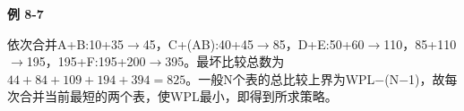 {\color{ink}\bfseries 例 8-7}\par\vspace{1bp}依次合并A+\allowbreak{}B:10+\allowbreak{}35\(\to \)45，C+\allowbreak{}(AB):40+\allowbreak{}45\(\to \)85，D+\allowbreak{}E:50+\allowbreak{}60\(\to \)110，85+\allowbreak{}110\(\to \)195，195+\allowbreak{}F:195+\allowbreak{}200\(\to \)395。最坏比较总数为\(44+\allowbreak{}84+\allowbreak{}109+\allowbreak{}194+\allowbreak{}394=\allowbreak{}825\)。一般N个表的总比较上界为WPL\(-\)(N\(-\)1)，故每次合并当前最短的两个表，使WPL最小，即得到所求策略。
